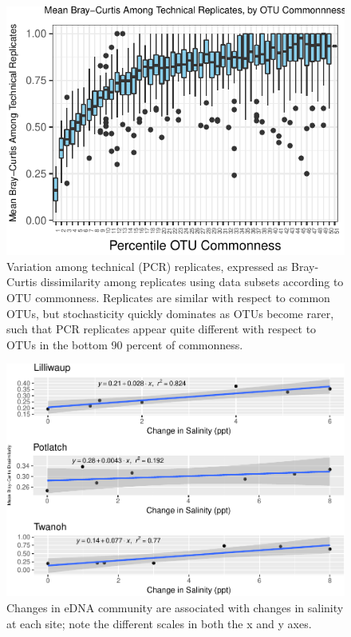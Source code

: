 \documentclass[fleqn,10pt,lineno]{wlpeerj} %
\begin{document}
\begin{figure}[!ht]

{\centering \includegraphics{20171117_Tides_and_eDNA_RPK_files/figure-latex/stochastic_variation_rareTail-1} 

}

\caption{\label{fig:SuppFig2}Variation among technical (PCR) replicates, expressed as Bray-Curtis dissimilarity among replicates using data subsets according to OTU commonness. Replicates are similar with respect to common OTUs, but stochasticity quickly dominates as OTUs become rarer, such that PCR replicates appear quite different with respect to OTUs in the bottom 90 percent of commonness.}\label{fig:stochastic_variation_rareTail}
\end{figure}

\begin{figure}[!ht]

{\centering \includegraphics{20171117_Tides_and_eDNA_RPK_files/figure-latex/salinity_BC_correlations-1} 

}

\caption{\label{fig:SupplFig3}Changes in eDNA community are associated with changes in salinity at each site; note the different scales in both the x and y axes.}\label{fig:salinity_BC_correlations}
\end{figure}
\end{document}
